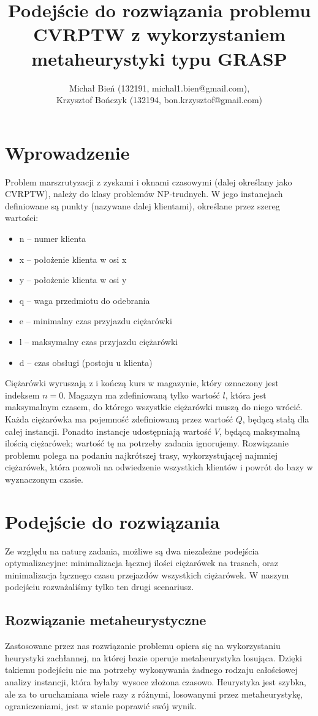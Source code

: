 \documentclass[a4paper]{article}
\date{}
\title{Podejście do rozwiązania problemu CVRPTW z wykorzystaniem metaheurystyki typu GRASP}
\author{Michał Bień (132191, michal1.bien@gmail.com),\\ Krzysztof Bończyk (132194, bon.krzysztof@gmail.com)}
\begin{document}
\maketitle

\section{Wprowadzenie}
Problem marszrutyzacji z zyskami i oknami czasowymi (dalej określany jako CVRPTW), należy do klasy problemów NP-trudnych. W jego instancjach\cite{cvrptw} definiowane są punkty (nazywane dalej klientami), określane przez szereg wartości:\\
\begin{itemize}
\item n -- numer klienta
\item x -- położenie klienta w osi x
\item y -- położenie klienta w osi y
\item q -- waga przedmiotu do odebrania
\item e -- minimalny czas przyjazdu ciężarówki
\item l -- maksymalny czas przyjazdu ciężarówki
\item d -- czas obsługi (postoju u klienta)
\end{itemize}
Ciężarówki wyruszają z i kończą kurs w magazynie, który oznaczony jest indeksem $n = 0$. Magazyn ma zdefiniowaną tylko wartość $l$, która jest maksymalnym czasem, do którego wszystkie ciężarówki muszą do niego wrócić. Każda ciężarówka ma pojemność zdefiniowaną przez wartość $Q$, będącą stałą dla całej instancji. Ponadto instancje udostępniają wartość $V$, będącą maksymalną ilością ciężarówek; wartość tę na potrzeby zadania\cite{drozd} ignorujemy. Rozwiązanie problemu polega na podaniu najkrótszej trasy, wykorzystującej najmniej ciężarówek, która pozwoli na odwiedzenie wszystkich klientów i powrót do bazy w wyznaczonym czasie.

\section{Podejście do rozwiązania}
Ze względu na naturę zadania, możliwe są dwa niezależne podejścia optymalizacyjne: minimalizacja łącznej ilości ciężarówek na trasach, oraz minimalizacja łącznego czasu przejazdów wszystkich ciężarówek. W naszym podejściu rozważaliśmy tylko ten drugi scenariusz.

\subsection{Rozwiązanie metaheurystyczne}
Zastosowane przez nas rozwiązanie problemu opiera się na wykorzystaniu heurystyki zachłannej, na której bazie operuje metaheurystyka losująca. Dzięki takiemu podejściu nie ma potrzeby wykonywania żadnego rodzaju całościowej analizy instancji, która byłaby wysoce złożona czasowo. Heurystyka jest szybka, ale za to uruchamiana wiele razy z różnymi, losowanymi przez metaheurystykę, ograniczeniami, jest w stanie poprawić swój wynik.
\end{document}
